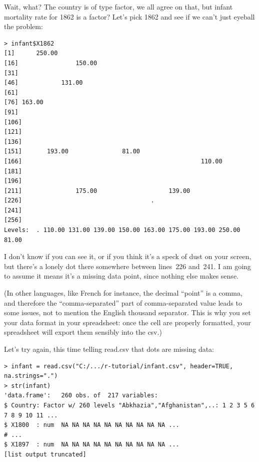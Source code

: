 \documentclass{report}
\newcommand{\code}[1]{\textsf{\ttfamily #1}}
\begin{document}
		Wait, what? The country is of type factor, we all agree on that, but infant mortality rate for 1862 is a factor? Let's pick 1862 and see if we can't just eyeball the problem:
		\begin{verbatim}
> infant$X1862
[1]      250.00
[16]     			150.00
[31] 
[46]            131.00
[61] 
[76] 163.00
[91] 
[106]
[121] 
[136] 
[151]       193.00               81.00
[166]                                                  110.00
[181] 
[196] 
[211]               175.00                    139.00
[226]                                    .
[241]
[256]                                   
Levels:  . 110.00 131.00 139.00 150.00 163.00 175.00 193.00 250.00 81.00
		\end{verbatim}
		
		I don't know if you can see it, or if you think it's a speck of dust on your screen, but there's a lonely dot there somewhere between lines~226 and~241. I am going to assume it means it's a missing data point, since nothing else makes sense.
		
		(In other languages, like French for instance, the decimal ``point'' is a comma, and therefore the ``comma-separated'' part of comma-separated value leads to some issues, not to mention the English thousand separator. This is why you set your data format in your spreadsheet: once the cell are properly formatted, your spreadsheet will export them sensibly into the csv.)
		
		Let's try again, this time telling \code{read.csv} that dots are missing data:
		\begin{verbatim}
> infant = read.csv("C:/.../r-tutorial/infant.csv", header=TRUE, na.strings=".")
> str(infant)
'data.frame':   260 obs. of  217 variables:
$ Country: Factor w/ 260 levels "Abkhazia","Afghanistan",..: 1 2 3 5 6 7 8 9 10 11 ...
$ X1800  : num  NA NA NA NA NA NA NA NA NA NA ...
# ...
$ X1897  : num  NA NA NA NA NA NA NA NA NA NA ...
[list output truncated]
		\end{verbatim}
		
\end{document}
